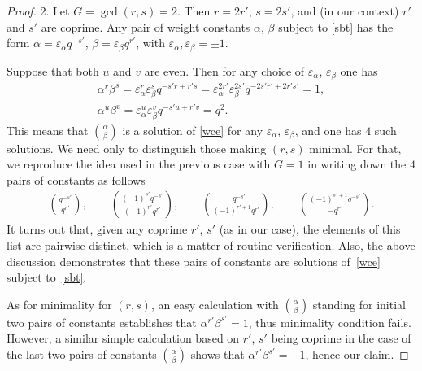 \documentclass[pdftex]{sigma}
\numberwithin{equation}{section}
\begin{document}
\begin{proof}
2. Let $G=\operatorname{gcd}(r,s)=2$. Then $r=2r'$, $s=2s'$, and (in our context) $r'$ and $s'$ are coprime. Any pair of weight constants $\alpha$, $\beta$ subject to \eqref{sbt} has the form $\alpha=\varepsilon_\alpha q^{-s'}$, $\beta=\varepsilon_\beta q^{r'}$, with $\varepsilon_\alpha,\varepsilon_\beta=\pm 1$.

Suppose that both $u$ and $v$ are even. Then for any choice of $\varepsilon_\alpha$, $\varepsilon_\beta$ one has
\begin{gather*}
\alpha^r\beta^s=\varepsilon_\alpha^r\varepsilon_\beta^sq^{-s'r+r's}=\varepsilon_\alpha^{2r'}\varepsilon_\beta^{2s'}q^{-2s'r'+2r's'}=1,\\
\alpha^u\beta^v=\varepsilon_\alpha^u\varepsilon_\beta^vq^{-s'u+r'v}=q^2.\end{gather*}
This means that $\binom{\alpha}{\beta}$ is a solution of \eqref{wce} for any $\varepsilon_\alpha$, $\varepsilon_\beta$, and one has $4$ such solutions. We need only to distinguish those making $(r,s)$ minimal. For that, we reproduce the idea used in the previous case with $G=1$ in writing down the $4$ pairs of constants as follows
\begin{gather*}
\binom{q^{-s'}}{q^{r'}},\qquad\binom{(-1)^{s'}q^{-s'}}{(-1)^{r'}q^{r'}},\qquad \binom{-q^{-s'}}{(-1)^{r'+1}q^{r'}},\qquad\binom{(-1)^{s'+1}q^{-s'}}{-q^{r'}}.
\end{gather*}
It turns out that, given any coprime $r'$, $s'$ (as in our case), the elements of this list are pairwise distinct, which is a matter of routine verification. Also, the above discussion demonstrates that these pairs of constants are solutions of~\eqref{wce} subject to~\eqref{sbt}.

As for minimality for $(r,s)$, an easy calculation with $\binom{\alpha}{\beta}$ standing for initial two pairs of constants establishes that $\alpha^{r'}\beta^{s'}=1$, thus minimality condition fails. However, a similar simple calculation based on $r'$, $s'$ being coprime in the case of the last two pairs of constants $\binom{\alpha}{\beta}$ shows that $\alpha^{r'}\beta^{s'}=-1$, hence our claim.


\end{proof}
\end{document}

